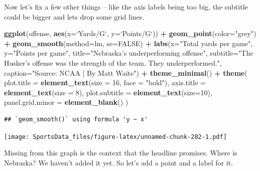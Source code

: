 \documentclass[
]{book}
\newenvironment{Shaded}{\begin{snugshade}}{\end{snugshade}}
\newcommand{\DataTypeTok}[1]{\textcolor[rgb]{0.13,0.29,0.53}{#1}}
\newcommand{\DecValTok}[1]{\textcolor[rgb]{0.00,0.00,0.81}{#1}}
\newcommand{\KeywordTok}[1]{\textcolor[rgb]{0.13,0.29,0.53}{\textbf{#1}}}
\newcommand{\NormalTok}[1]{#1}
\newcommand{\OperatorTok}[1]{\textcolor[rgb]{0.81,0.36,0.00}{\textbf{#1}}}
\newcommand{\OtherTok}[1]{\textcolor[rgb]{0.56,0.35,0.01}{#1}}
\newcommand{\StringTok}[1]{\textcolor[rgb]{0.31,0.60,0.02}{#1}}
\begin{document}
Now let's fix a few other things -- like the axis labels being too big, the subtitle could be bigger and lets drop some grid lines.

\begin{Shaded}
\begin{Highlighting}[]
\KeywordTok{ggplot}\NormalTok{(offense, }\KeywordTok{aes}\NormalTok{(}\DataTypeTok{x=}\StringTok{`}\DataTypeTok{Yards/G}\StringTok{`}\NormalTok{, }\DataTypeTok{y=}\StringTok{`}\DataTypeTok{Points/G}\StringTok{`}\NormalTok{)) }\OperatorTok{+}\StringTok{ }
\StringTok{  }\KeywordTok{geom_point}\NormalTok{(}\DataTypeTok{color=}\StringTok{"grey"}\NormalTok{) }\OperatorTok{+}\StringTok{ }\KeywordTok{geom_smooth}\NormalTok{(}\DataTypeTok{method=}\NormalTok{lm, }\DataTypeTok{se=}\OtherTok{FALSE}\NormalTok{) }\OperatorTok{+}\StringTok{ }
\StringTok{  }\KeywordTok{labs}\NormalTok{(}\DataTypeTok{x=}\StringTok{"Total yards per game"}\NormalTok{, }\DataTypeTok{y=}\StringTok{"Points per game"}\NormalTok{, }\DataTypeTok{title=}\StringTok{"Nebraska's underperforming offense"}\NormalTok{, }\DataTypeTok{subtitle=}\StringTok{"The Husker's offense was the strength of the team. They underperformed."}\NormalTok{, }\DataTypeTok{caption=}\StringTok{"Source: NCAA | By Matt Waite"}\NormalTok{) }\OperatorTok{+}\StringTok{ }
\StringTok{  }\KeywordTok{theme_minimal}\NormalTok{() }\OperatorTok{+}\StringTok{ }
\StringTok{  }\KeywordTok{theme}\NormalTok{(}
    \DataTypeTok{plot.title =} \KeywordTok{element_text}\NormalTok{(}\DataTypeTok{size =} \DecValTok{16}\NormalTok{, }\DataTypeTok{face =} \StringTok{"bold"}\NormalTok{),}
    \DataTypeTok{axis.title =} \KeywordTok{element_text}\NormalTok{(}\DataTypeTok{size =} \DecValTok{8}\NormalTok{), }
    \DataTypeTok{plot.subtitle =} \KeywordTok{element_text}\NormalTok{(}\DataTypeTok{size=}\DecValTok{10}\NormalTok{), }
    \DataTypeTok{panel.grid.minor =} \KeywordTok{element_blank}\NormalTok{()}
\NormalTok{    ) }
\end{Highlighting}
\end{Shaded}

\begin{verbatim}
## `geom_smooth()` using formula 'y ~ x'
\end{verbatim}

\texttt{[image: SportsData\_files/figure-latex/unnamed-chunk-282-1.pdf]}

Missing from this graph is the context that the headline promises. Where is Nebraska? We haven't added it yet. So let's add a point and a label for it.
\end{document}
